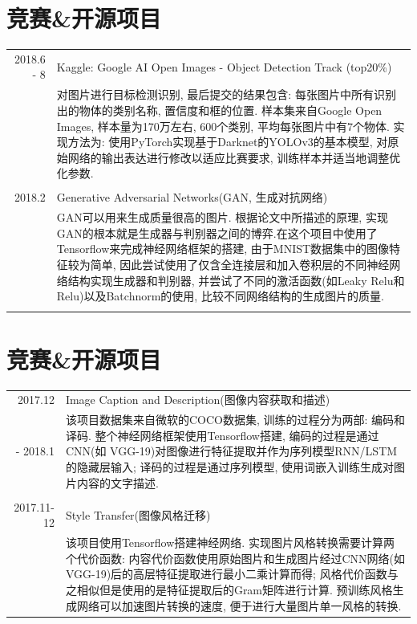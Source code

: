 \documentclass[a4paper,11pt]{article}
\begin{document}
\section{竞赛\&开源项目}
\begin{tabular}{r|p{11cm}}
\textsc{2018.6 - 8} & Kaggle: Google AI Open Images - Object Detection Track (top20\%)\\&\footnotesize{对图片进行目标检测识别, 最后提交的结果包含: 每张图片中所有识别出的物体的类别名称, 置信度和框的位置. 样本集来自Google Open Images, 样本量为170万左右, 600个类别, 平均每张图片中有7个物体. 实现方法为: 使用PyTorch实现基于Darknet的YOLOv3的基本模型, 对原始网络的输出表达进行修改以适应比赛要求, 训练样本并适当地调整优化参数.}\\\multicolumn{2}{c}{} \\
\textsc{2018.2} & Generative Adversarial Networks(GAN, 生成对抗网络)\\&\footnotesize{GAN可以用来生成质量很高的图片. 根据论文中所描述的原理, 实现GAN的根本就是生成器与判别器之间的博弈.在这个项目中使用了Tensorflow来完成神经网络框架的搭建, 由于MNIST数据集中的图像特征较为简单, 因此尝试使用了仅含全连接层和加入卷积层的不同神经网络结构实现生成器和判别器, 并尝试了不同的激活函数(如Leaky Relu和Relu)以及Batchnorm的使用, 比较不同网络结构的生成图片的质量.}\\\multicolumn{2}{c}{} \\
\end{tabular}

\section{竞赛\&开源项目}
\begin{tabular}{r|p{11cm}}
\textsc{2017.12} & Image Caption and Description(图像内容获取和描述)\\{- 2018.1}&\footnotesize{该项目数据集来自微软的COCO数据集, 训练的过程分为两部: 编码和译码. 整个神经网络框架使用Tensorflow搭建, 编码的过程是通过CNN(如 VGG-19)对图像进行特征提取并作为序列模型RNN/LSTM的隐藏层输入; 译码的过程是通过序列模型, 使用词嵌入训练生成对图片内容的文字描述.  }\\\multicolumn{2}{c}{} \\
\textsc{2017.11-12} & Style Transfer(图像风格迁移)\\&\footnotesize{该项目使用Tensorflow搭建神经网络. 实现图片风格转换需要计算两个代价函数: 内容代价函数使用原始图片和生成图片经过CNN网络(如VGG-19)后的高层特征提取进行最小二乘计算而得; 风格代价函数与之相似但是使用的是特征提取后的Gram矩阵进行计算. 预训练风格生成网络可以加速图片转换的速度, 便于进行大量图片单一风格的转换. }
\end{tabular}
\end{document}
